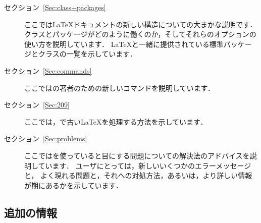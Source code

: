 \documentclass{ltxguide}[2001/05/28]
\begin{document}
\begin{description}

\item[セクション~\ref{Sec:class+packages}]
ここでは\LaTeX{}ドキュメントの新しい構造についての大まかな説明です．
クラスとパッケージがどのように働くのか，そしてそれらのオプションの使い方を説明しています．
 \LaTeX{}と一緒に提供されている標準パッケージとクラスの一覧を示しています．

\item[セクション~\ref{Sec:commands}] 
ここでは\LaTeXe{}の著者のための新しいコマンドを説明しています．

\item[セクション~\ref{Sec:209}]
ここでは，\LaTeXe{}で古い\LaTeX{}を処理する方法を示しています．

\item[セクション~\ref{Sec:problems}] 
ここでは\LaTeXe{}を使っていると目にする問題についての解決法のアドバイスを説明しています．
\LaTeXe{}ユーザにとっては，新しいいくつかのエラーメッセージと，
よく現れる問題と，それへの対処方法，あるいは，より詳しい情報が期にあるかを示しています．
   
\end{description}

\subsection{追加の情報}
\end{document}
